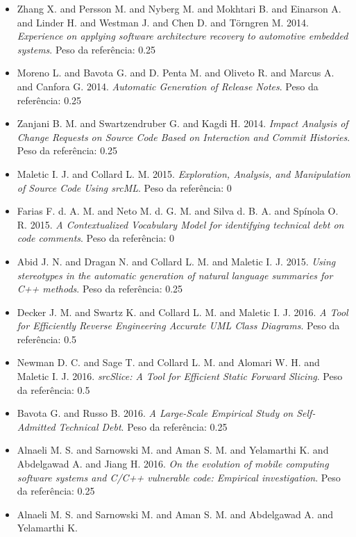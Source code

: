 \begin{itemize}
      {\it An Exploratory Study on Self-Admitted Technical Debt}.
      Peso da referência: 0.25
\item Zhang X. and Persson M. and Nyberg M. and Mokhtari B. and Einarson A. and Linder H. and Westman J. and Chen D. and Törngren M.
      2014.
      {\it Experience on applying software architecture recovery to automotive embedded systems}.
      Peso da referência: 0.25
\item Moreno L. and Bavota G. and D. Penta M. and Oliveto R. and Marcus A. and Canfora G.
      2014.
      {\it Automatic Generation of Release Notes}.
      Peso da referência: 0.25
\item Zanjani B. M. and Swartzendruber G. and Kagdi H.
      2014.
      {\it Impact Analysis of Change Requests on Source Code Based on Interaction and Commit Histories}.
      Peso da referência: 0.25
\item Maletic I. J. and Collard L. M.
      2015.
      {\it Exploration, Analysis, and Manipulation of Source Code Using srcML}.
      Peso da referência: 0
\item Farias F. d. A. M. and Neto M. d. G. M. and Silva d. B. A. and Spínola O. R.
      2015.
      {\it A Contextualized Vocabulary Model for identifying technical debt on code comments}.
      Peso da referência: 0
\item Abid J. N. and Dragan N. and Collard L. M. and Maletic I. J.
      2015.
      {\it Using stereotypes in the automatic generation of natural language summaries for C++ methods}.
      Peso da referência: 0.25
\item Decker J. M. and Swartz K. and Collard L. M. and Maletic I. J.
      2016.
      {\it A Tool for Efficiently Reverse Engineering Accurate UML Class Diagrams}.
      Peso da referência: 0.5
\item Newman D. C. and Sage T. and Collard L. M. and Alomari W. H. and Maletic I. J.
      2016.
      {\it srcSlice: A Tool for Efficient Static Forward Slicing}.
      Peso da referência: 0.5
\item Bavota G. and Russo B.
      2016.
      {\it A Large-Scale Empirical Study on Self-Admitted Technical Debt}.
      Peso da referência: 0.25
\item Alnaeli M. S. and Sarnowski M. and Aman S. M. and Yelamarthi K. and Abdelgawad A. and Jiang H.
      2016.
      {\it On the evolution of mobile computing software systems and C/C++ vulnerable code: Empirical investigation}.
      Peso da referência: 0.25
\item Alnaeli M. S. and Sarnowski M. and Aman S. M. and Abdelgawad A. and Yelamarthi K.

\end{itemize}
